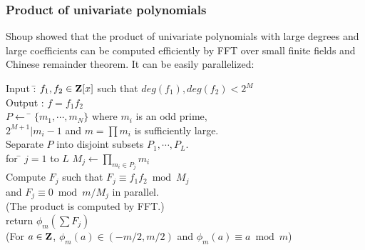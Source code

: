 %
%
%
%
%
%
%

\subsubsection{Product of univariate polynomials}

Shoup \cite{Shoup} showed that the product of univariate polynomials
with large degrees and large coefficients can be computed efficiently
by FFT over small finite fields and Chinese remainder theorem.
It can be easily parallelized:

\begin{tabbing}
Input :\= $f_1, f_2 \in {\bf Z}[x]$ such that $deg(f_1), deg(f_2) < 2^M$\\
Output : $f = f_1f_2$ \\
$P \leftarrow$ \= $\{m_1,\cdots,m_N\}$ where $m_i$ is an odd prime, \\
\> $2^{M+1}|m_i-1$ and $m=\prod m_i $ is sufficiently large. \\
Separate $P$ into disjoint subsets $P_1, \cdots, P_L$.\\
for \= $j=1$ to $L$ $M_j \leftarrow \prod_{m_i\in P_j} m_i$\\
Compute $F_j$ such that $F_j \equiv f_1f_2 \bmod M_j$\\
\> and $F_j \equiv 0 \bmod m/M_j$ in parallel.\\
\> (The product is computed by FFT.)\\
return $\phi_m(\sum F_j)$\\
(For $a \in {\bf Z}$, $\phi_m(a) \in (-m/2,m/2)$ and $\phi_m(a)\equiv a \bmod m$)
\end{tabbing}

